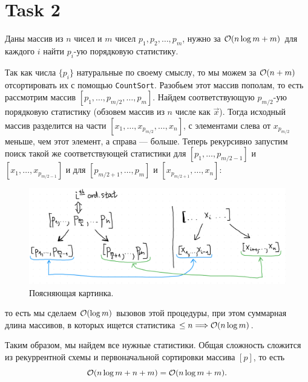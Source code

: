 \section{Task 2}
\begin{task}
    Даны массив из $n$ чисел и $m$ чисел $p_1, p_2, \ldots, p_m$, нужно за $\mathcal{O}(n\log m + m)$ для каждого $i$ найти $p_i$-ую порядковую статистику.
\end{task}

\begin{solution}
    Так как числа $\{p_i\}$ натуральные по своему смыслу, то мы можем за $\mathcal{O}(n + m)$ отсортировать их с помощью \texttt{CountSort}. Разобьем этот массив пополам, то есть рассмотрим массив $[p_1,\ldots,p_{m/2},\ldots,p_m]$. Найдем соответствующую $p_{m/2}$-ую порядковую статистику (обзовем массив из $n$ числе как $\vec{x}$). Тогда исходный массив разделится на части $[x_1, \ldots, x_{p_{m/2}}, \ldots, x_n]$, с элементами слева от $x_{p_{m/2}}$ меньше, чем этот элемент, а справа --- больше. Теперь рекурсивно запустим поиск такой же соответствующей статистики для $[p_1, \ldots, p_{m/2-1}]$ и $[x_1, \ldots, x_{p_{m/2-1}}]$ и для $[p_{m/2+1},\ldots, p_m]$ и $[x_{p_{m/2+1}},\ldots,x_n]$:
    \begin{figure}[H]
        \centering
        \includegraphics[width=\textwidth]{pics/k_ord_stats.png}
        \caption{Поясняющая картинка.}
    \end{figure}
    \no то есть мы сделаем $\mathcal{O}(\log m)$ вызовов этой процедуры, при этом суммарная длина массивов, в которых ищется статистика $\leq n \Longrightarrow \mathcal{O}(n\log m)$.
    
    Таким образом, мы найдем все нужные статистики. Общая сложность сложится из рекуррентной схемы и первоначальной сортировки массива $[p]$, то есть 
    \begin{equation}
        \mathcal{O}(n\log m + n + m) = \mathcal{O}(n\log m + m).
    \end{equation}
\end{solution}